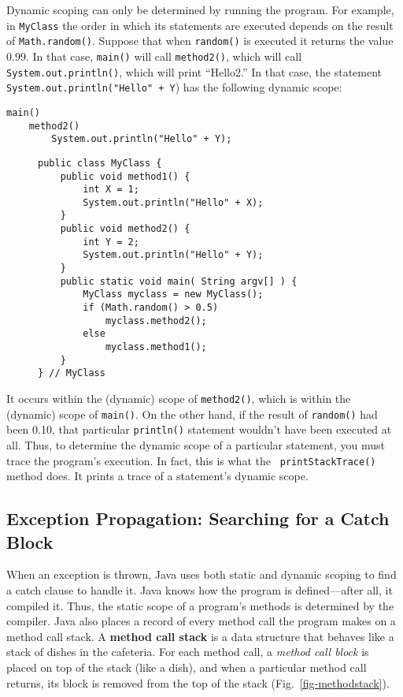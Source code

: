 Dynamic scoping can only be determined by running the program.  For
example, in \mbox{\tt MyClass} the order in which its statements are
executed depends on the result of {\tt Math.random()}.  Suppose that
when {\tt random()} is executed it returns the value 0.99. In that
case, {\tt main()} will call {\tt method2()}, which will call {\tt
System.out.println()}, which will print ``Hello2.''  In that case, the
statement {\tt System.out.println("Hello" + Y}) has the following
dynamic scope:

\begin{jjjlisting}
\begin{lstlisting}
main()
    method2()
        System.out.println("Hello" + Y);
\end{lstlisting}
\end{jjjlisting}

\begin{figure}[tb]
\jjjprogstart
\begin{jjjlisting}
\begin{lstlisting}
public class MyClass {
    public void method1() {
        int X = 1;
        System.out.println("Hello" + X);
    }
    public void method2() {
        int Y = 2;
        System.out.println("Hello" + Y);
    }
    public static void main( String argv[] ) {
        MyClass myclass = new MyClass();
        if (Math.random() > 0.5)
            myclass.method2();
        else
            myclass.method1();
    }
} // MyClass
\end{lstlisting}
\end{jjjlisting}
\end{figure}

\noindent It occurs within the (dynamic) scope of {\tt method2()},
which is within the (dynamic) scope of {\tt main()}. On the other
hand, if the result of {\tt random()} had been 0.10, that particular
{\tt println()} statement wouldn't have been executed at all.  Thus, to
determine the dynamic scope of a particular statement, you must trace
the program's execution.  In fact, this is what the {\tt
printStackTrace()} method does.  It prints a trace of a statement's
dynamic scope.

\subsection{Exception Propagation: Searching for a Catch Block}
\noindent When an exception is thrown, Java uses both static and dynamic scoping
to find a catch clause to handle it.  Java knows how the program is
defined---after all, it compiled it.  Thus, the static scope of a
program's methods is determined by the compiler.  Java also places a
record of every method call the program makes on a method call stack.
A {\bf method call stack} is a
 data structure that behaves like a
stack of dishes in the cafeteria.  For each method call, a {\it method
call block} is placed on top of the stack (like a dish), and when a
particular method call returns, its block is removed from the top of
the stack (Fig.~\ref{fig-methodstack}).


